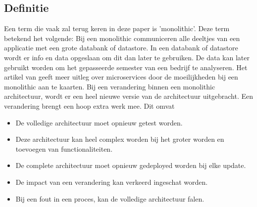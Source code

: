 \subsection{Definitie}
Een term die vaak zal terug keren in deze paper is 'monolithic'. Deze term betekend het volgende: Bij een monolithic communiceren alle deeltjes van een applicatie met een grote databank of datastore. In een databank of datastore wordt er info en data opgeslaan om dit dan later te gebruiken. De data kan later gebruikt worden om het gepasseerde semester van een bedrijf te analyseren. 
Het artikel van \textcite{Mauersberger2017} geeft meer uitleg over microservices door de moeilijkheden bij een monolithic aan te kaarten. Bij een verandering binnen een monolithic architectuur, wordt er een heel nieuwe versie van de architectuur uitgebracht. Een verandering brengt een hoop extra werk mee. Dit omvat 
\begin{itemize}
	\item De volledige architectuur moet opnieuw getest worden.
	\item Deze architectuur kan heel complex worden bij het groter worden en toevoegen van functionaliteiten.
	\item De complete architectuur moet opnieuw gedeployed worden bij elke update.
	\item De impact van een verandering kan verkeerd ingeschat worden.
	\item Bij een fout in een proces, kan de volledige architectuur falen.
\end{itemize}
